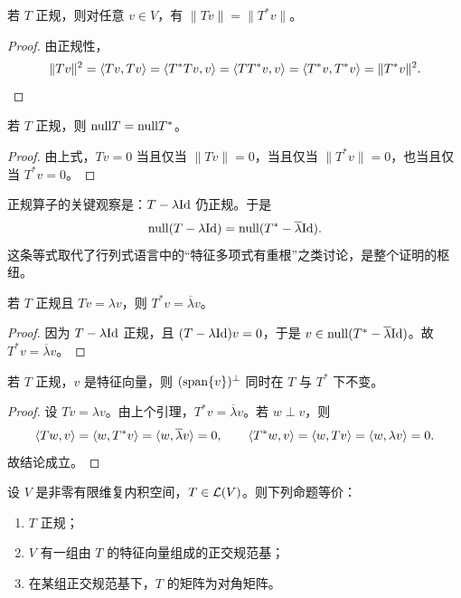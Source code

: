 \begin{lemma}
若 $T$ 正规，则对任意 $v\in V$，有 $\|Tv\|=\|T^*v\|$。
\end{lemma}

\begin{proof}
由正规性，
\[
\|Tv\|^2=\langle Tv, Tv \rangle=\langle T^*Tv, v \rangle=\langle TT^*v, v \rangle=\langle T^*v, T^*v \rangle=\|T^*v\|^2.
\]
\end{proof}

\begin{corollary}
若 $T$ 正规，则 $\mathrm{null} T=\mathrm{null} T^*$。
\end{corollary}

\begin{proof}
由上式，$Tv=0$ 当且仅当 $\|Tv\|=0$，当且仅当 $\|T^*v\|=0$，也当且仅当 $T^*v=0$。
\end{proof}

正规算子的关键观察是：$T-\lambda\mathrm{Id}$ 仍正规。于是
\[
\mathrm{null}(T-\lambda\mathrm{Id})=\mathrm{null}(T^*-\overline{\lambda}\mathrm{Id}).
\]
这条等式取代了行列式语言中的“特征多项式有重根”之类讨论，是整个证明的枢纽。

\begin{lemma}
若 $T$ 正规且 $Tv=\lambda v$，则 $T^*v=\overline{\lambda}v$。
\end{lemma}

\begin{proof}
因为 $T-\lambda\mathrm{Id}$ 正规，且 $(T-\lambda\mathrm{Id})v=0$，于是 $v\in\mathrm{null}(T^*-\overline{\lambda}\mathrm{Id})$。故 $T^*v=\overline{\lambda}v$。
\end{proof}

\begin{lemma}
若 $T$ 正规，$v$ 是特征向量，则 $(\operatorname{span}\{v\})^\perp$ 同时在 $T$ 与 $T^*$ 下不变。
\end{lemma}

\begin{proof}
设 $Tv=\lambda v$。由上个引理，$T^*v=\overline{\lambda}v$。若 $w\perp v$，则
\[
\langle Tw, v \rangle=\langle w, T^*v \rangle=\langle w, \overline{\lambda}v \rangle=0,
\qquad
\langle T^*w, v \rangle=\langle w, Tv \rangle=\langle w, \lambda v \rangle=0.
\]
故结论成立。
\end{proof}

\begin{theorem}[复谱定理]
设 $V$ 是非零有限维复内积空间，$T\in\mathcal{L}(V)$。则下列命题等价：
\begin{enumerate}[label=(\arabic*)]
\item $T$ 正规；
\item $V$ 有一组由 $T$ 的特征向量组成的正交规范基；
\item 在某组正交规范基下，$T$ 的矩阵为对角矩阵。
\end{enumerate}
\end{theorem}

